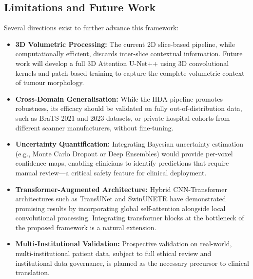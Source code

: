 \documentclass[conference]{IEEEtran}
\begin{document}
\subsection{Limitations and Future Work}
Several directions exist to further advance this framework:

\begin{itemize}
    \item \textbf{3D Volumetric Processing:} The current 2D slice-based pipeline, while computationally efficient, discards inter-slice contextual information. Future work will develop a full 3D Attention U-Net++ using 3D convolutional kernels and patch-based training to capture the complete volumetric context of tumour morphology.

    \item \textbf{Cross-Domain Generalisation:} While the HDA pipeline promotes robustness, its efficacy should be validated on fully out-of-distribution data, such as BraTS 2021 and 2023 datasets, or private hospital cohorts from different scanner manufacturers, without fine-tuning.

    \item \textbf{Uncertainty Quantification:} Integrating Bayesian uncertainty estimation (e.g., Monte Carlo Dropout or Deep Ensembles) would provide per-voxel confidence maps, enabling clinicians to identify predictions that require manual review—a critical safety feature for clinical deployment.

    \item \textbf{Transformer-Augmented Architecture:} Hybrid CNN-Transformer architectures such as TransUNet and SwinUNETR have demonstrated promising results by incorporating global self-attention alongside local convolutional processing. Integrating transformer blocks at the bottleneck of the proposed framework is a natural extension.

    \item \textbf{Multi-Institutional Validation:} Prospective validation on real-world, multi-institutional patient data, subject to full ethical review and institutional data governance, is planned as the necessary precursor to clinical translation.
\end{itemize}

\end{document}
